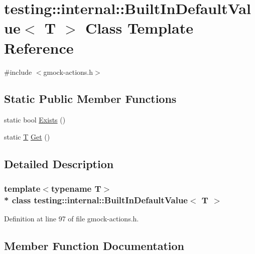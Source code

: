 \hypertarget{classtesting_1_1internal_1_1_built_in_default_value}{}\section{testing\+:\+:internal\+:\+:Built\+In\+Default\+Value$<$ T $>$ Class Template Reference}
\label{classtesting_1_1internal_1_1_built_in_default_value}


{\ttfamily \#include $<$gmock-\/actions.\+h$>$}

\subsection*{Static Public Member Functions}
\begin{DoxyCompactItemize}
\item 
static bool \hyperlink{classtesting_1_1internal_1_1_built_in_default_value_a35207bc20a493b0efb3980eb9a08dd2f}{Exists} ()
\item 
static \hyperlink{functions__7_8js_adf1f3edb9115acb0a1e04209b7a9937b}{T} \hyperlink{classtesting_1_1internal_1_1_built_in_default_value_a7e26c1df14a887c8f393b29d6ea162e6}{Get} ()
\end{DoxyCompactItemize}


\subsection{Detailed Description}
\subsubsection*{template$<$typename T$>$\\*
class testing\+::internal\+::\+Built\+In\+Default\+Value$<$ T $>$}



Definition at line 97 of file gmock-\/actions.\+h.



\subsection{Member Function Documentation}
